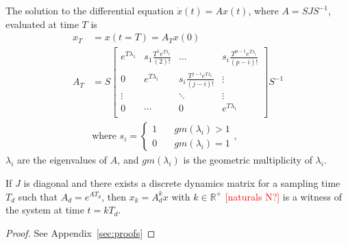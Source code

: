 \documentclass[sigconf]{llncs}
\newcommand{\mat}[1]{{#1}}
\renewcommand{\vec}[1]{{#1}}
\renewcommand{\note}[1]{\textcolor{red}{[#1]}}
\begin{document}
 \begin{theorem}
 The solution to the differential equation $\dot{\vec{x}}(t)=\mat{A}\vec{x}(t)$, where $\mat{A}=\mat{S}\mat{J}\mat{S}^{-1}$,
 evaluated at time $T$ is
 \begin{align}
 \vec{x}_T&=\vec{x}(t=T)=\mat{A}_{T}\vec{x} (0)\\
 \mat{A}_{T}&= \mat{S}
 \left [ \begin{array}{cccc}
 e^{T\lambda_1}  & s_1\frac{T^{1}e^{T\lambda_i}}{(2)!} & \hdots  & s_i\frac{T^{p-1}e^{T\lambda_i}}{(p-i)!} \\
0 & e^{T\lambda_i}  & s_i\frac{T^{j-i}e^{T\lambda_i}}{(j-i)!} & \vdots \\
\vdots & & \ddots & \vdots \\
0 & \cdots & 0  &e^{T\lambda_i} \\
\end{array} \right ]
 \mat{S}^{-1}
 \label{eq:continuous_tube_dyn}\\
 &\text{where } s_i=\left\{\begin{array}{cc}1&\quad gm(\lambda_i)>1\\0&\quad gm(\lambda_i)=1\end{array}\right.,\nonumber
 \end{align}
$\lambda_i$ are the eigenvalues of $\mat{A}$, and $gm(\lambda_i)$ is the geometric multiplicity of $\lambda_i$.  
 \end{theorem}
 \begin{corollary}
 If $\mat{J}$ is diagonal and there exists a discrete dynamics matrix for a sampling time $T_d$ such that $A_d=e^{\mat{A} T_d}$, then $\vec{x}_k=A_d^k\vec{x} \text{ with } k \in \mathbb{R}^+$ \note{naturals N?} is a witness of the system at time $t=kT_d$.
 \end{corollary}
\begin{proof}
See Appendix~\ref{sec:proofs}
\end{proof}
\end{document}
